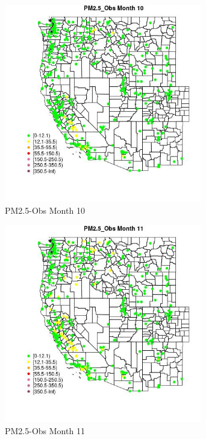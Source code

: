 \clearpage 

\begin{figure} 
\centering  
\includegraphics[width=0.77\textwidth]{Code_Outputs/ML_input_report_ML_input_PM25_Step5_part_d_de_duplicated_aves_ML_input_MapObsMo10PM25_Obs.jpg} 
\caption{\label{fig:ML_input_report_ML_input_PM25_Step5_part_d_de_duplicated_aves_ML_inputMapObsMo10PM25_Obs}PM2.5-Obs Month 10} 
\end{figure} 
 

\begin{figure} 
\centering  
\includegraphics[width=0.77\textwidth]{Code_Outputs/ML_input_report_ML_input_PM25_Step5_part_d_de_duplicated_aves_ML_input_MapObsMo11PM25_Obs.jpg} 
\caption{\label{fig:ML_input_report_ML_input_PM25_Step5_part_d_de_duplicated_aves_ML_inputMapObsMo11PM25_Obs}PM2.5-Obs Month 11} 
\end{figure} 
 

